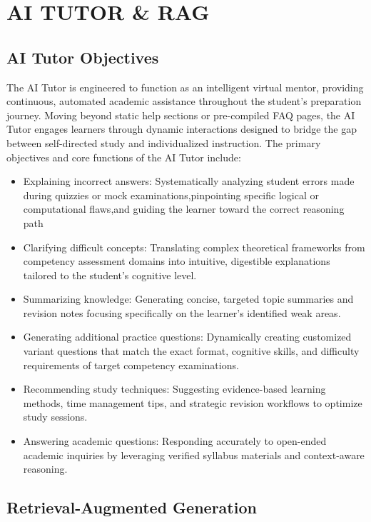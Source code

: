 \chapter{AI TUTOR \& RAG}

\section{AI Tutor Objectives}

The AI Tutor is engineered to function as an intelligent virtual mentor, providing continuous, automated academic assistance throughout the student's preparation journey. Moving beyond static help sections or pre-compiled FAQ pages, the AI Tutor engages learners through dynamic interactions designed to bridge the gap between self-directed study and individualized instruction. The primary objectives and core functions of the AI Tutor include:

\begin{itemize}
    \item Explaining incorrect answers: Systematically analyzing student errors made during quizzies or mock examinations,pinpointing specific logical or computational flaws,and guiding the learner  toward the correct reasoning path 
    \item Clarifying difficult concepts: Translating complex theoretical frameworks from competency assessment domains into intuitive, digestible explanations tailored to the student's cognitive level.
    \item Summarizing knowledge: Generating concise, targeted topic summaries and revision notes focusing specifically on the learner's identified weak areas.
    \item Generating additional practice questions: Dynamically creating customized variant questions that match the exact format, cognitive skills, and difficulty requirements of target competency examinations.
    \item Recommending study techniques: Suggesting evidence-based learning methods, time management tips, and strategic revision workflows to optimize study sessions.
    \item Answering academic questions: Responding accurately to open-ended academic inquiries by leveraging verified syllabus materials and context-aware reasoning.
\end{itemize}

\section{Retrieval-Augmented Generation}

